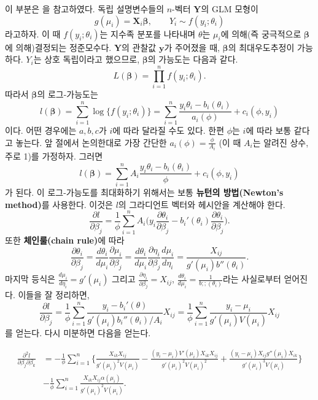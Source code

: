 \documentclass[b5paper,]{scrbook}
\theoremstyle{plain}
\theoremstyle{definition}
\numberwithin{equation}{section}
\begin{document}
이 부분은 \citep{Wood2006}을 참고하였다. 독립 설명변수들의 \(n\)-벡터 \(\mathbf{Y}\)의 GLM 모형이
\[g(\mu_{i})=\mathbf{X}_{i}\boldsymbol{\beta}, \qquad{Y_{i}\sim f(y_{i};\theta_{i})}\]
라고하자. 이 때 \(f(y_{i};\theta_{i})\)는 지수족 분포를 나타내며 \(\theta\)는 \(\mu_{i}\)에 의해(즉 궁극적으로 \(\boldsymbol{\beta}\)에 의해)결정되는 정준모수다. \(\mathbf{Y}\)의 관찰값 \(\mathbf{y}\)가 주어졌을 때, \(\boldsymbol{\beta}\)의 최대우도추정이 가능하다. \(Y_{i}\)는 상호 독립이라고 했으므로, \(\boldsymbol{\beta}\)의 가능도는 다음과 같다.
\[L(\boldsymbol{\beta})=\prod_{i=1}^{n}f(y_{i};\theta_{i}).\]
따라서 \(\boldsymbol{\beta}\)의 로그-가능도는
\[l(\boldsymbol{\beta})=\sum_{i=1}^{n}\log \{ f(y_{i};\theta_{i}) \}=\sum_{i=1}^{n}\frac{y_{i}\theta_{i}-b_{i}(\theta_{i})}{a_{i}(\phi)}+c_{i}(\phi,y_{i})\]
이다. 어떤 경우에는 \(a,b,c\)가 \(i\)에 따라 달라질 수도 있다. 한편 \(\phi\)는 \(i\)에 따라 보통 같다고 놓는다. 앞 절에서 논의한대로 가장 간단한 \(a_{i}(\phi)=\frac{\phi}{A_{i}}\) (이 때 \(A_{i}\)는 알려진 상수, 주로 1)를 가정하자. 그러면
\[l(\boldsymbol{\beta})=\sum_{i=1}^{n}A_{i}\frac{y_{i}\theta_{i}-b_{i}(\theta_{i})}{\phi}+c_{i}(\phi,y_{i})\]
가 된다. 이 로그-가능도를 최대화하기 위해서는 보통 \textbf{뉴턴의 방법(Newton's method)}를 사용한다. 이것은 \(l\)의 그라디언트 벡터와 헤시안을 계산해야 한다.
\[\frac{\partial l}{\partial \beta_{j}}=\frac{1}{\phi}\sum_{i=1}^{n}A_{i}\Big( y_{i}\frac{\partial \theta_{i}}{\partial \beta_{j}}-b_{i}'(\theta_{i})\frac{\partial \theta_{i}}{\partial \beta_{j}}   \Big).\]
또한 \textbf{체인룰(chain rule)}에 따라
\[\frac{\partial \theta_{i}}{\partial \beta_{j}}=\frac{d\theta_{i}}{d\mu_{i}}\frac{\partial\mu_{i}}{\partial \beta_{j}} =\frac{d\theta_{i}}{d\mu_{i}}\frac{\partial\eta_{i}}{\partial \beta_{j}}\frac{d\mu_{i}}{d\eta_{i}}=\frac{X_{ij}}{g'(\mu_{i})b''(\theta_{i})}.\]
마지막 등식은 \(\frac{d\mu_{i}}{d\eta_{i}}=g'(\mu_{i})\) 그리고 \(\frac{\partial\eta_{i}}{\partial \beta_{j}}=X_{ij}\), \(\frac{d\theta_{i}}{d\mu_{i}}=\frac{1}{b;;(\theta_{i})}\)라는 사실로부터 얻어진다. 이들을 잘 정리하면,
\[\frac{\partial l}{\partial \beta_{j}}=\frac{1}{\phi}\sum_{i=1}^{n}\frac{y_{i}-b_{i}'(\theta)}{g'(\mu_{i})b_{i}''(\theta_{i})/A_{i}}X_{ij}=\frac{1}{\phi}\sum_{i=1}^{n}\frac{y_{i}-\mu_{i}}{g'(\mu_{i})V(\mu_{i})}X_{ij}\]
를 얻는다. 다시 미분하면 다음을 얻는다.

\begin{align*}
\frac{\partial^{2}l}{\partial \beta_{j}\partial \beta_{k}}&=-\frac{1}{\phi}\sum_{i=1}^{n}\Big\{ \frac{X_{ik}X_{ij}}{g'(\mu_{i})^{2}V(\mu_{i})} - \frac{(y_{i}-\mu_{i})V'(\mu_{i})X_{ik}X_{ij}}{g'(\mu_{i})^{2}V(\mu_{i})^{2}}+\frac{(y_{i}-\mu_{i})X_{ij}g''(\mu_{i})X_{ik}}{g'(\mu_{i})^{3}V(\mu_{i})} \Big\}\\
&-\frac{1}{\phi}\sum_{i=1}^{n}\frac{X_{ik}X_{ij}\alpha(\mu_{i})}{g'(\mu_{i})^{2}V(\mu_{i})}.
\end{align*}
\end{document}
